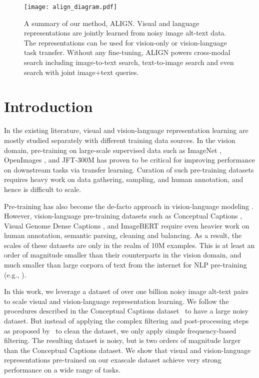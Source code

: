 \documentclass{article}
\begin{document}
\begin{figure*}[t]
    \centering
    \texttt{[image: align\_diagram.pdf]}
    \vskip -0.1in
    \caption{A summary of our method, ALIGN. Visual and language representations are jointly learned from noisy image alt-text data. The representations can be used for vision-only or vision-language task transfer. Without any fine-tuning, ALIGN powers cross-modal search including image-to-text search, text-to-image search and even search with joint image+text queries.}
    \label{fig:diagram}
    \vskip -0.1in
\end{figure*}

\section{Introduction}
In the existing literature, visual and vision-language representation learning are mostly studied separately with different training data sources. In the vision domain, pre-training
on large-scale supervised data such as ImageNet \cite{deng:imagenet}, OpenImages \cite{kuznetsova:openimages}, and JFT-300M \cite{sun:jft, kolensnikov:bit} has proven to be critical for improving performance on downstream tasks via transfer learning. Curation of such pre-training datasets requires heavy work on data gathering, sampling, and human annotation, and hence is difficult to scale.

Pre-training has also become the de-facto approach in vision-language modeling \cite{lu:vilbert, chen:uniter, li:oscar}. However, vision-language pre-training datasets such as Conceptual Captions \cite{sharma:cc3m}, Visual Genome Dense Captions \cite{krishna:visualgenome}, and ImageBERT \cite{qi:imagebert} require even heavier work on human annotation, semantic parsing, cleaning and balancing. As a result, the scales of these datasets are only in the realm of 10M examples. This is at least an order of magnitude smaller than their counterparts in the vision domain, and much smaller than large corpora of text from the internet for NLP
pre-training (e.g., \citet{devlin:bert, radford:gpt2, yang:xlnet, liu:roberta, raffel:t5}).

In this work, we leverage a dataset of over one billion noisy image alt-text pairs to scale visual and vision-language representation learning. We follow the procedures described in the Conceptual Captions dataset~\cite{sharma:cc3m} to have a large noisy dataset. But instead of applying the complex filtering and post-processing steps as proposed by~\cite{sharma:cc3m} to clean the dataset, we only apply simple frequency-based filtering. 
The resulting dataset is noisy, but is two orders of magnitude larger than the Conceptual Captions dataset. We show that visual and vision-language representations pre-trained on our exascale dataset achieve very strong performance on a wide range of tasks. 
\end{document}
